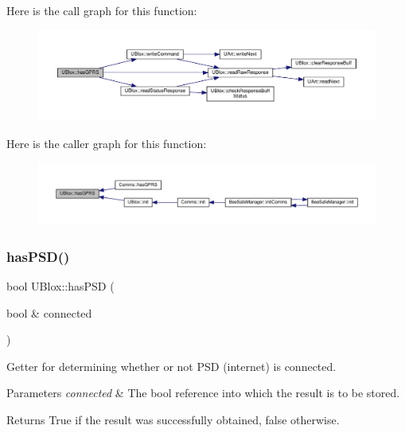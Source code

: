 Here is the call graph for this function\+:
\nopagebreak
\begin{figure}[H]
\begin{center}
\leavevmode
\includegraphics[width=350pt]{da/df6/class_u_blox_a4f5a31b4ddda664b255ce3f63e9ffac7_cgraph}
\end{center}
\end{figure}
Here is the caller graph for this function\+:
\nopagebreak
\begin{figure}[H]
\begin{center}
\leavevmode
\includegraphics[width=350pt]{da/df6/class_u_blox_a4f5a31b4ddda664b255ce3f63e9ffac7_icgraph}
\end{center}
\end{figure}
\mbox{\label{class_u_blox_ae49b51a602a327b5eff5b04d2ccaec20}} 
\subsubsection{\texorpdfstring{has\+P\+S\+D()}{hasPSD()}}
{\footnotesize\ttfamily bool U\+Blox\+::has\+P\+SD (\begin{DoxyParamCaption}\item[{bool \&}]{connected }\end{DoxyParamCaption})}

Getter for determining whether or not P\+SD (internet) is connected.


\begin{DoxyParams}{Parameters}
{\em connected} & The bool reference into which the result is to be stored. \\
\hline
\end{DoxyParams}
\begin{DoxyReturn}{Returns}
True if the result was successfully obtained, false otherwise. 
\end{DoxyReturn}


